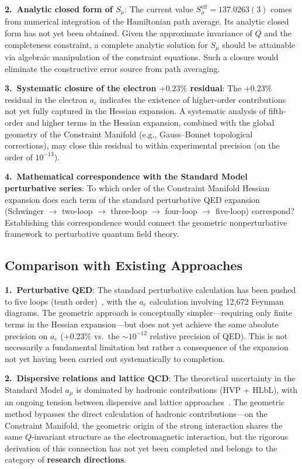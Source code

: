 \documentclass[aps,prd,reprint,nofootinbib]{revtex4-2}
\begin{document}
\textbf{2.\ Analytic closed form of $S_\mu$}: The current value $S_\mu^{\text{eff}} = 137.0263(3)$ comes from numerical integration of the Hamiltonian path average. Its analytic closed form has not yet been obtained. Given the approximate invariance of $Q$ and the completeness constraint, a complete analytic solution for $S_\mu$ should be attainable via algebraic manipulation of the constraint equations. Such a closure would eliminate the constructive error source from path averaging.

\textbf{3.\ Systematic closure of the electron $+0.23\%$ residual}: The $+0.23\%$ residual in the electron $a_e$ indicates the existence of higher-order contributions not yet fully captured in the Hessian expansion. A systematic analysis of fifth-order and higher terms in the Hessian expansion, combined with the global geometry of the Constraint Manifold (e.g., Gauss--Bonnet topological corrections), may close this residual to within experimental precision (on the order of $10^{-13}$).

\textbf{4.\ Mathematical correspondence with the Standard Model perturbative series}: To which order of the Constraint Manifold Hessian expansion does each term of the standard perturbative QED expansion (Schwinger $\to$ two-loop $\to$ three-loop $\to$ four-loop $\to$ five-loop) correspond? Establishing this correspondence would connect the geometric nonperturbative framework to perturbative quantum field theory.

\subsection{Comparison with Existing Approaches}

\textbf{1.\ Perturbative QED}: The standard perturbative calculation has been pushed to five loops (tenth order)~\cite{Aoyama2012,Laporta2017}, with the $a_e$ calculation involving 12,672 Feynman diagrams. The geometric approach is conceptually simpler---requiring only finite terms in the Hessian expansion---but does not yet achieve the same absolute precision on $a_e$ ($+0.23\%$ vs.\ the $\sim 10^{-12}$ relative precision of QED). This is not necessarily a fundamental limitation but rather a consequence of the expansion not yet having been carried out systematically to completion.

\textbf{2.\ Dispersive relations and lattice QCD}: The theoretical uncertainty in the Standard Model $a_\mu$ is dominated by hadronic contributions (HVP + HLbL), with an ongoing tension between dispersive and lattice approaches~\cite{Aoyama2020,Borsanyi2021,Davier2020}. The geometric method bypasses the direct calculation of hadronic contributions---on the Constraint Manifold, the geometric origin of the strong interaction shares the same $Q$-invariant structure as the electromagnetic interaction, but the rigorous derivation of this connection has not yet been completed and belongs to the category of \textbf{research directions}.
\end{document}
